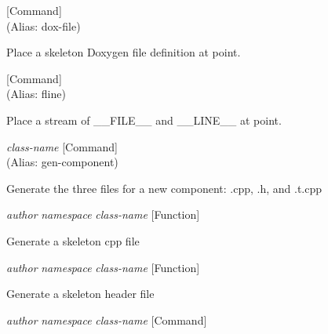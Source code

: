 \vspace{1em}
\noindent
{}
\usebox{\funcname}
 \hfill [Command]\\%
 (Alias: dox-file)

\begin{doc-string}
Place a skeleton Doxygen file definition at point.
\end{doc-string}

\vspace{1em}
\noindent
{}
\usebox{\funcname}
 \hfill [Command]\\%
 (Alias: fline)

\begin{doc-string}
Place a stream of \_\_FILE\_\_ and \_\_LINE\_\_ at point.
\end{doc-string}

\vspace{1em}
\noindent
{}
\usebox{\funcname}\emph{class-name}
 \hfill [Command]\\%
 (Alias: gen-component)

\begin{doc-string}
Generate the three files for a new component: .cpp, .h, and .t.cpp
\end{doc-string}

\vspace{1em}
\noindent
{}
\usebox{\funcname}\emph{author} \emph{namespace} \emph{class-name}
 \hfill [Function]

\begin{doc-string}
Generate a skeleton cpp file
\end{doc-string}

\vspace{1em}
\noindent
{}
\usebox{\funcname}\emph{author} \emph{namespace} \emph{class-name}
 \hfill [Function]

\begin{doc-string}
Generate a skeleton header file
\end{doc-string}

\vspace{1em}
\noindent
{}
\usebox{\funcname}\emph{author} \emph{namespace} \emph{class-name}
 \hfill [Command]

